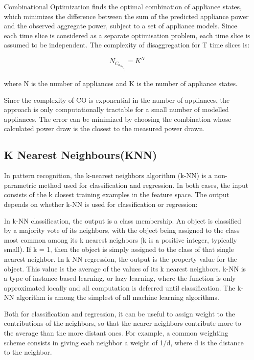 Combinational Optimization finds the optimal combination of appliance states, which minimizes the difference between the sum of the predicted appliance power and the observed aggregate power, subject to a set of appliance models. Since each time slice is considered as a separate optimisation problem, each time slice is assumed to be independent.
The complexity of disaggregation for T time slices is: 

\begin{equation}
N_C_o_m_b_i_n_a_t_i_o_n_s = K ^ N
\end{equation}

where N is the number of appliances and
K is the number of appliance states.

Since the complexity of CO is exponential in the number of appliances, the approach is only computationally tractable for a small number of modelled appliances. The error can be minimized by choosing the combination whose calculated power draw is the closest to the measured power drawn.

\subsection{K Nearest Neighbours(KNN)}
In pattern recognition, the k-nearest neighbors algorithm (k-NN) is a non-parametric method used for classification and regression. In both cases, the input consists of the k closest training examples in the feature space. The output depends on whether k-NN is used for classification or regression:

In k-NN classification, the output is a class membership. An object is classified by a majority vote of its neighbors, with the object being assigned to the class most common among its k nearest neighbors (k is a positive integer, typically small). If k = 1, then the object is simply assigned to the class of that single nearest neighbor.
In k-NN regression, the output is the property value for the object. This value is the average of the values of its k nearest neighbors.
k-NN is a type of instance-based learning, or lazy learning, where the function is only approximated locally and all computation is deferred until classification. The k-NN algorithm is among the simplest of all machine learning algorithms.

Both for classification and regression, it can be useful to assign weight to the contributions of the neighbors, so that the nearer neighbors contribute more to the average than the more distant ones. For example, a common weighting scheme consists in giving each neighbor a weight of 1/d, where d is the distance to the neighbor.

